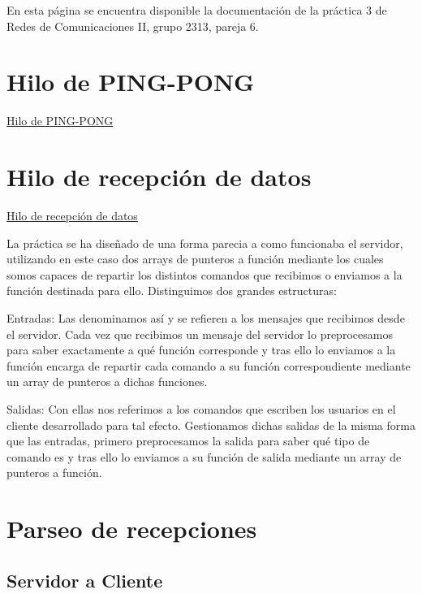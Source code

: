 En esta página se encuentra disponible la documentación de la práctica 3 de Redes de Comunicaciones II, grupo 2313, pareja 6.

\section*{Hilo de P\+I\+N\+G-\/\+P\+O\+NG}


\begin{DoxyItemize}
\item \hyperlink{client_function_ping}{Hilo de P\+I\+N\+G-\/\+P\+O\+NG} 
\end{DoxyItemize}\section*{Hilo de recepción de datos}


\begin{DoxyItemize}
\item \hyperlink{client_function_response}{Hilo de recepción de datos} 
\end{DoxyItemize}La práctica se ha diseñado de una forma parecia a como funcionaba el servidor, utilizando en este caso dos arrays de punteros a función mediante los cuales somos capaces de repartir los distintos comandos que recibimos o enviamos a la función destinada para ello. Distinguimos dos grandes estructuras\+: 
\begin{DoxyItemize}
\item Entradas\+: Las denominamos así y se refieren a los mensajes que recibimos desde el servidor. Cada vez que recibimos un mensaje del servidor lo preprocesamos para saber exactamente a qué función corresponde y tras ello lo enviamos a la función encarga de repartir cada comando a su función correspondiente mediante un array de punteros a dichas funciones. 
\item Salidas\+: Con ellas nos referimos a los comandos que escriben los usuarios en el cliente desarrollado para tal efecto. Gestionamos dichas salidas de la misma forma que las entradas, primero preprocesamos la salida para saber qué tipo de comando es y tras ello lo enviamos a su función de salida mediante un array de punteros a función. 
\end{DoxyItemize}\section*{Parseo de recepciones}

\subsection*{Servidor a Cliente}


